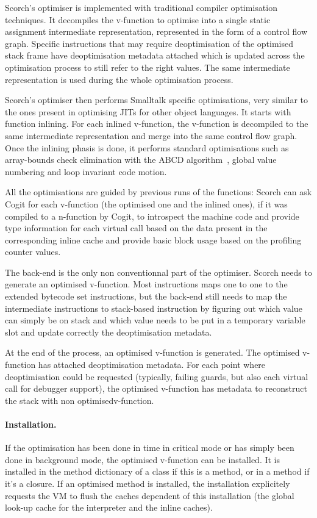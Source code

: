 \documentclass[a4paper,12pt,twoside]{../includes/ThesisStyle}
\begin{document}
Scorch's optimiser is implemented with traditional compiler optimisation techniques. It decompiles the v-function to optimise into a single static assignment intermediate representation, represented in the form of a control flow graph. Specific instructions that may require deoptimisation of the optimised stack frame have deoptimisation metadata attached which is updated across the optimisation process to still refer to the right values. The same intermediate representation is used during the whole optimisation process.

Scorch's optimiser then performs Smalltalk specific optimisations, very similar to the ones present in optimising JITs for other object languages. It starts with function inlining. For each inlined v-function, the v-function is decompiled to the same intermediate representation and merge into the same control flow graph. Once the inlining phasis is done, it performs standard optimisations such as array-bounds check elimination with the ABCD algorithm~\cite{Bodi00a}, global value numbering and loop invariant code motion.

All the optimisations are guided by previous runs of the functions: Scorch can ask Cogit for each v-function (the optimised one and the inlined ones), if it was compiled to a n-function by Cogit, to introspect the machine code and provide type information for each virtual call based on the data present in the corresponding inline cache and provide basic block usage based on the profiling counter values.

The back-end is the only non conventionnal part of the optimiser. Scorch needs to generate an optimised v-function. Most instructions maps one to one to the extended bytecode set instructions, but the back-end still needs to map the intermediate instructions to stack-based instruction by figuring out which value can simply be on stack and which value needs to be put in a temporary variable slot and update correctly the deoptimisation metadata.

At the end of the process, an optimised v-function is generated. The optimised v-function has attached deoptimisation metadata. For each point where deoptimisation could be requested (typically, failing guards, but also each virtual call for debugger support), the optimised v-function has metadata to reconstruct the stack with non optimisedv-function.

\paragraph{Installation.}
If the optimisation has been done in time in critical mode or has simply been done in background mode, the optimised v-function can be installed. It is installed in the method dictionary of a class if this is a method, or in a method if it's a closure. If an optimised method is installed, the installation explicitely requests the VM to flush the caches dependent of this installation (the global look-up cache for the interpreter and the inline caches).
\end{document}
